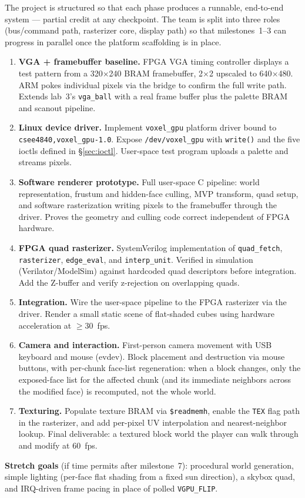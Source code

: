\documentclass[11pt]{article}
\begin{document}
The project is structured so that each phase produces a runnable, end-to-end system --- partial credit at any checkpoint. The team is split into three roles (bus/command path, rasterizer core, display path) so that milestones~1--3 can progress in parallel once the platform scaffolding is in place.

\begin{enumerate}
\item \textbf{VGA + framebuffer baseline.} FPGA VGA timing controller displays a test pattern from a 320$\times$240 BRAM framebuffer, 2$\times$2 upscaled to 640$\times$480. ARM pokes individual pixels via the bridge to confirm the full write path. Extends lab~3's \texttt{vga\_ball} with a real frame buffer plus the palette BRAM and scanout pipeline.

\item \textbf{Linux device driver.} Implement \texttt{voxel\_gpu} platform driver bound to \texttt{csee4840,voxel\_gpu-1.0}. Expose \texttt{/dev/voxel\_gpu} with \texttt{write()} and the five ioctls defined in \S\ref{sec:ioctl}. User-space test program uploads a palette and streams pixels.

\item \textbf{Software renderer prototype.} Full user-space C pipeline: world representation, frustum and hidden-face culling, MVP transform, quad setup, and software rasterization writing pixels to the framebuffer through the driver. Proves the geometry and culling code correct independent of FPGA hardware.

\item \textbf{FPGA quad rasterizer.} SystemVerilog implementation of \texttt{quad\_fetch}, \texttt{rasterizer}, \texttt{edge\_eval}, and \texttt{interp\_unit}. Verified in simulation (Verilator/ModelSim) against hardcoded quad descriptors before integration. Add the Z-buffer and verify z-rejection on overlapping quads.

\item \textbf{Integration.} Wire the user-space pipeline to the FPGA rasterizer via the driver. Render a small static scene of flat-shaded cubes using hardware acceleration at $\geq$30~fps.

\item \textbf{Camera and interaction.} First-person camera movement with USB keyboard and mouse (evdev). Block placement and destruction via mouse buttons, with per-chunk face-list regeneration: when a block changes, only the exposed-face list for the affected chunk (and its immediate neighbors across the modified face) is recomputed, not the whole world.

\item \textbf{Texturing.} Populate texture BRAM via \texttt{\$readmemh}, enable the \texttt{TEX} flag path in the rasterizer, and add per-pixel UV interpolation and nearest-neighbor lookup. Final deliverable: a textured block world the player can walk through and modify at 60~fps.
\end{enumerate}

\noindent\textbf{Stretch goals} (if time permits after milestone~7): procedural world generation, simple lighting (per-face flat shading from a fixed sun direction), a skybox quad, and IRQ-driven frame pacing in place of polled \texttt{VGPU\_FLIP}.
\end{document}

